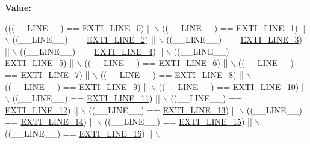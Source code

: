 {\bfseries Value\+:}
\begin{DoxyCode}
(((\_\_LINE\_\_) == \hyperlink{group___e_x_t_i___line_gac1a9cd58d76e9f497abecc832e3294c8}{EXTI\_LINE\_0}) || \(\backslash\)
                                 ((\_\_LINE\_\_) == \hyperlink{group___e_x_t_i___line_gaf64b8deca0cf44b4c58d2b4d0fcd2177}{EXTI\_LINE\_1}) || \(\backslash\)
                                 ((\_\_LINE\_\_) == \hyperlink{group___e_x_t_i___line_gaec48b88f5279b95962682300c0650840}{EXTI\_LINE\_2}) || \(\backslash\)
                                 ((\_\_LINE\_\_) == \hyperlink{group___e_x_t_i___line_ga7e223d61dcb2b538040824c0b491d68c}{EXTI\_LINE\_3}) || \(\backslash\)
                                 ((\_\_LINE\_\_) == \hyperlink{group___e_x_t_i___line_gaf8e1e94adf29806583e68170c1dad7dd}{EXTI\_LINE\_4}) || \(\backslash\)
                                 ((\_\_LINE\_\_) == \hyperlink{group___e_x_t_i___line_gab7859f0b07e671f71be61d7d301eb909}{EXTI\_LINE\_5}) || \(\backslash\)
                                 ((\_\_LINE\_\_) == \hyperlink{group___e_x_t_i___line_gaebcb8302f9aae1d54c7aada7ade230c0}{EXTI\_LINE\_6}) || \(\backslash\)
                                 ((\_\_LINE\_\_) == \hyperlink{group___e_x_t_i___line_ga32a33e800bf0f754d0337ab30abde810}{EXTI\_LINE\_7}) || \(\backslash\)
                                 ((\_\_LINE\_\_) == \hyperlink{group___e_x_t_i___line_ga0bb9322e3cfbe3a256f9e479ba3e5664}{EXTI\_LINE\_8}) || \(\backslash\)
                                 ((\_\_LINE\_\_) == \hyperlink{group___e_x_t_i___line_ga714a1411d5dc8bcf6b6efe69396fbccf}{EXTI\_LINE\_9}) || \(\backslash\)
                                 ((\_\_LINE\_\_) == \hyperlink{group___e_x_t_i___line_gac94dbc4ff94b573f4dd796d60dcd250c}{EXTI\_LINE\_10}) || \(\backslash\)
                                 ((\_\_LINE\_\_) == \hyperlink{group___e_x_t_i___line_ga301648b2965852f535209429f71e251b}{EXTI\_LINE\_11}) || \(\backslash\)
                                 ((\_\_LINE\_\_) == \hyperlink{group___e_x_t_i___line_ga4ff15c98aec7cd3fd0f0c5bd5cfaa501}{EXTI\_LINE\_12}) || \(\backslash\)
                                 ((\_\_LINE\_\_) == \hyperlink{group___e_x_t_i___line_ga8e144f1beae1e5d259f5d4aed6a3efe0}{EXTI\_LINE\_13}) || \(\backslash\)
                                 ((\_\_LINE\_\_) == \hyperlink{group___e_x_t_i___line_ga60b812a0a6fe00af8db8763b8202a463}{EXTI\_LINE\_14}) || \(\backslash\)
                                 ((\_\_LINE\_\_) == \hyperlink{group___e_x_t_i___line_ga9e711303de4e32d120d2551dc5c64dd7}{EXTI\_LINE\_15}) || \(\backslash\)
                                 ((\_\_LINE\_\_) == \hyperlink{group___e_x_t_i___line_ga92cf76ca2f7a5638944ccd94e842ebb1}{EXTI\_LINE\_16}) || \(\backslash\)

\end{DoxyCode}
